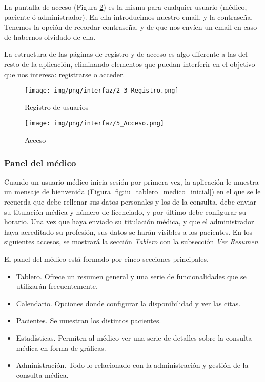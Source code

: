 \documentclass[a4paper,oneside,11pt]{book}
\begin{document}
			La pantalla de acceso (Figura \ref{fig:iu_acceso}) es la misma para cualquier usuario (médico, paciente ó administrador). En ella introducimos nuestro email, y la contraseña. Tenemos la opción de recordar contraseña, y de que nos envíen un email en caso de habernos olvidado de ella.
			
			La estructura de las páginas de registro y de acceso es algo diferente a las del resto de la aplicación, eliminando elementos que puedan interferir en el objetivo que nos interesa: registrarse o acceder.
					
			\begin{figure}[H]
			  \centering
			    \texttt{[image: img/png/interfaz/2\_3\_Registro.png]}
			  \caption{Registro de usuarios}
			  \label{fig:iu_registro}
			\end{figure}
			
			\begin{figure}[H]
			  \centering
			    \texttt{[image: img/png/interfaz/5\_Acceso.png]}
			  \caption{Acceso}
			  \label{fig:iu_acceso}
			\end{figure}
			
	
	\subsubsection{Panel del médico} %
		\label{sub:panel_medico}
		
		Cuando un usuario médico inicia sesión por primera vez, la aplicación le muestra un mensaje de bienvenida (Figura \ref{fig:iu_tablero_medico_inicial}) en el que se le recuerda que debe rellenar sus datos personales y los de la consulta, debe enviar su titulación médica y número de licenciado, y por último debe configurar su horario. Una vez que haya enviado su titulación médica, y que el administrador haya acreditado su profesión, sus datos se harán visibles a los pacientes. En los siguientes accesos, se mostrará la sección \textit{Tablero} con la subsección \textit{Ver Resumen}.		
	
		El panel del médico está formado por cinco secciones principales.
		\begin{itemize}
			\item Tablero. Ofrece un resumen general y una serie de funcionalidades que se utilizarán frecuentemente.
			\item Calendario. Opciones donde configurar la disponibilidad y ver las citas.
			\item Pacientes. Se muestran los distintos pacientes.
			\item Estadísticas. Permiten al médico ver una serie de detalles sobre la consulta médica en forma de gráficas.
			\item Administración. Todo lo relacionado con la administración y gestión de la consulta médica.
		\end{itemize}
		
\end{document}
